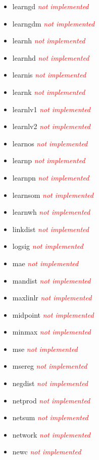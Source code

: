 \begin{itemize}
	\item learngd \textcolor{red}{\textit{not implemented}}
	\item learngdm \textcolor{red}{\textit{not implemented}}
	\item learnh \textcolor{red}{\textit{not implemented}}
	\item learnhd \textcolor{red}{\textit{not implemented}}
	\item learnis \textcolor{red}{\textit{not implemented}}
	\item learnk \textcolor{red}{\textit{not implemented}}
	\item learnlv1 \textcolor{red}{\textit{not implemented}} 
	\item learnlv2 \textcolor{red}{\textit{not implemented}}
	\item learnos \textcolor{red}{\textit{not implemented}}
	\item learnp \textcolor{red}{\textit{not implemented}}
	\item learnpn \textcolor{red}{\textit{not implemented}}
	\item learnsom \textcolor{red}{\textit{not implemented}}
	\item learnwh \textcolor{red}{\textit{not implemented}}
	\item linkdist \textcolor{red}{\textit{not implemented}}
	\item logsig \textcolor{red}{\textit{not implemented}}
	\item mae \textcolor{red}{\textit{not implemented}}
	\item mandist \textcolor{red}{\textit{not implemented}}
	\item maxlinlr \textcolor{red}{\textit{not implemented}}
	\item midpoint \textcolor{red}{\textit{not implemented}}
	\item minmax \textcolor{red}{\textit{not implemented}}
	\item mse \textcolor{red}{\textit{not implemented}}
	\item msereg \textcolor{red}{\textit{not implemented}}
	\item negdist \textcolor{red}{\textit{not implemented}}
	\item netprod \textcolor{red}{\textit{not implemented}}
	\item netsum \textcolor{red}{\textit{not implemented}}
	\item network \textcolor{red}{\textit{not implemented}}
	\item newc \textcolor{red}{\textit{not implemented}}

\end{itemize}

